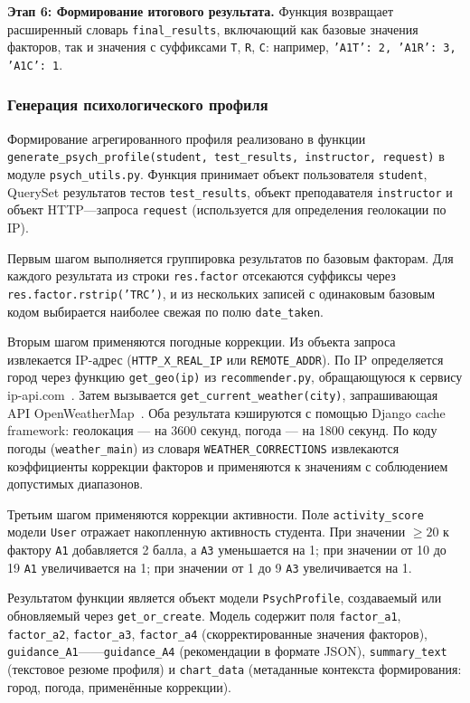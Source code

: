 \textbf{Этап 6: Формирование итогового результата.} Функция возвращает 
расширенный словарь \texttt{final\_results}, включающий как базовые 
значения факторов, так и значения с суффиксами \texttt{T}, \texttt{R}, 
\texttt{C}: например, \texttt{'A1T': 2, 'A1R': 3, 'A1C': 1}.

\subsubsection{Генерация психологического профиля}

Формирование агрегированного профиля реализовано в функции 
\texttt{generate\_psych\_profile(student, test\_results, instructor, request)} 
в модуле \texttt{psych\_utils.py}. Функция принимает объект 
пользователя \texttt{student}, QuerySet результатов тестов 
\texttt{test\_results}, объект преподавателя \texttt{instructor} и 
объект HTTP---запроса \texttt{request} (используется для определения 
геолокации по IP).

Первым шагом выполняется группировка результатов по базовым факторам. 
Для каждого результата из строки \texttt{res.factor} отсекаются 
суффиксы через \texttt{res.factor.rstrip('TRC')}, и из нескольких 
записей с одинаковым базовым кодом выбирается наиболее свежая по 
полю \texttt{date\_taken}.

Вторым шагом применяются погодные коррекции. Из объекта запроса 
извлекается IP-адрес (\texttt{HTTP\_X\_REAL\_IP} или 
\texttt{REMOTE\_ADDR}). По IP определяется город через функцию 
\texttt{get\_geo(ip)} из \texttt{recommender.py}, 
обращающуюся к сервису ip-api.com~\cite{ipapi2026}. Затем вызывается 
\texttt{get\_current\_weather(city)}, запрашивающая API 
OpenWeatherMap~\cite{openweathermap2026}. Оба результата кэшируются 
с помощью Django cache framework: геолокация --- на 3600 секунд, 
погода --- на 1800 секунд. По коду погоды (\texttt{weather\_main}) 
из словаря \texttt{WEATHER\_CORRECTIONS} извлекаются коэффициенты 
коррекции факторов и применяются к значениям с соблюдением 
допустимых диапазонов.

Третьим шагом применяются коррекции активности. Поле 
\texttt{activity\_score} модели \texttt{User} отражает накопленную 
активность студента. При значении $\geq 20$ к фактору \texttt{A1} 
добавляется 2 балла, а \texttt{A3} уменьшается на 1; при значении 
от 10 до 19 \texttt{A1} увеличивается на 1; при значении от 1 до 9 
\texttt{A3} увеличивается на 1.

Результатом функции является объект модели \texttt{PsychProfile}, 
создаваемый или обновляемый через \texttt{get\_or\_create}. Модель 
содержит поля \texttt{factor\_a1}, \texttt{factor\_a2}, 
\texttt{factor\_a3}, \texttt{factor\_a4} (скорректированные значения 
факторов), \texttt{guidance\_A1}------\texttt{guidance\_A4} 
(рекомендации в формате JSON), \texttt{summary\_text} (текстовое 
резюме профиля) и \texttt{chart\_data} (метаданные контекста 
формирования: город, погода, применённые коррекции).

